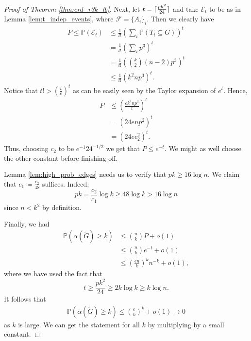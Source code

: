 \documentclass{report}
\DeclarePairedDelimiter\ceil{\lceil}{\rceil}
\theoremstyle{definition}
\theoremstyle{plain}
\theoremstyle{definition}
\begin{document}
\begin{proof}[Proof of Theorem \ref{thm:erd_r3k_lb}]
		Next, let $t = \ceil{\frac{pk^2}{24}}$ and take $\mathcal{E}_t$ to be as in Lemma \ref{lem:t_indep_events}, where $\mathcal{F} = \{A_i\}_i$. Then we clearly have
		\begin{align*}
			P \leq \mathbb{P}(\mathcal{E}_t) &\leq \frac{1}{t!}\left(\sum_{i}\mathbb{P}(T_i\subseteq G)\right)^t\\
			&= \frac{1}{t!}\left(\sum_{i}p^3\right)^t\\
			&= \frac{1}{t!}\left(\binom{k}{2}(n-2) p^3\right)^t\\
			&\leq \frac{1}{t!}(k^2np^3)^t.
		\end{align*}
		Notice that $t!> \left(\frac{t}{e}\right)^t$ as can be easily seen by the Taylor expansion of $e^t$. Hence,
		\begin{align*}
			P &\leq \left(\frac{ek^2np^3}{t}\right)^t\\
			&= (24enp^2)^t\\
			&= (24ec_2^2)^t.
		\end{align*}
		Thus, choosing $c_2$ to be $e^{-1}24^{-1/2}$ we get that $P\leq e^{-t}$. We might as well choose the other constant before finishing off.
		
		Lemma \ref{lem:high_prob_edges} needs us to verify that $pk \geq 16\log n$. We claim that $c_1 \coloneqq \frac{c_2}{48}$ suffices. Indeed,
		\[
			pk = \frac{c_2}{c_1} \log k \geq 48 \log k > 16 \log n
		\]
		since $n < k^2$ by definition. 
		
		Finally, we had 
		\begin{align*}
			\mathbb{P}(\alpha(\tilde{G}) \geq k) &\leq \binom{n}{k}P + o(1)\\
			&\leq \binom{n}{k}e^{-t} + o(1)\\
			&\leq \left(\frac{en}{k}\right)^kn^{-k} + o(1),
		\end{align*}
		where we have used the fact that
		\[
			t \geq \frac{pk^2}{24} \geq 2k\log k \geq k\log n.
		\]
		It follows that 
		\begin{align*}
			\mathbb{P}(\alpha(\tilde{G}) \geq k) \leq \left(\frac{e}{k}\right)^k + o(1) \to 0
		\end{align*}
		as $k$ is large. We can get the statement for all $k$ by multiplying by a small constant.
	\end{proof}
\end{document}
